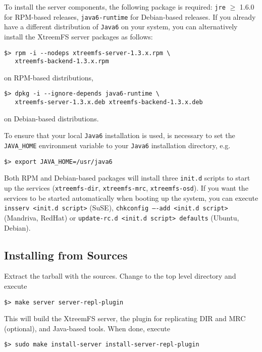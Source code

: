 \documentclass[a4paper,10pt]{book}
\begin{document}
To install the server components, the following package is required: \texttt{jre} $\geq$ 1.6.0 for RPM-based releases, \texttt{java6-runtime} for Debian-based releases. If you already have a different distribution of \texttt{Java6} on your system, you can alternatively install the XtreemFS server packages as follows:

\begin{verbatim}
$> rpm -i --nodeps xtreemfs-server-1.3.x.rpm \
   xtreemfs-backend-1.3.x.rpm
\end{verbatim}

on RPM-based distributions,

\begin{verbatim}
$> dpkg -i --ignore-depends java6-runtime \
   xtreemfs-server-1.3.x.deb xtreemfs-backend-1.3.x.deb
\end{verbatim}

on Debian-based distributions.

To ensure that your local \texttt{Java6} installation is used, is necessary to set the \texttt{JAVA\_HOME} environment variable to your \texttt{Java6} installation directory, e.g.\

\begin{verbatim}
$> export JAVA_HOME=/usr/java6
\end{verbatim}


Both RPM and Debian-based packages will install three \texttt{init.d} scripts to start up the services (\texttt{xtreemfs-dir}, \texttt{xtreemfs-mrc}, \texttt{xtreemfs-osd}). If you want the services to be started automatically when booting up the system, you can execute \texttt{insserv <init.d script>} (SuSE), \texttt{chkconfig ----add <init.d script>} (Mandriva, RedHat) or \texttt{update-rc.d <init.d script> defaults} (Ubuntu, Debian).

\subsection{Installing from Sources}

Extract the tarball with the sources. Change to the top level directory and execute

\begin{verbatim}
$> make server server-repl-plugin
\end{verbatim}

This will build the XtreemFS server, the plugin for replicating DIR and MRC (optional), and Java-based tools. When done, execute

\begin{verbatim}
$> sudo make install-server install-server-repl-plugin
\end{verbatim}
\end{document}
